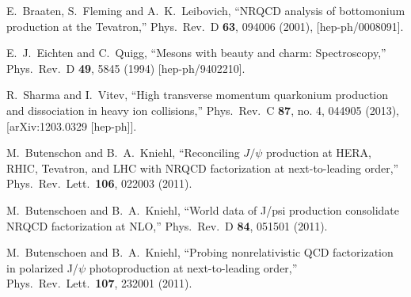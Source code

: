 \documentclass[aps,prc,preprint,superscriptaddress,showpacs,showkeys,amsmath]{revtex4-1}
\begin{document}
\begin{thebibliography}{100}
  E.~Braaten, S.~Fleming and A.~K.~Leibovich,
  ``NRQCD analysis of bottomonium production at the Tevatron,''
  Phys.\ Rev.\ D {\bf 63}, 094006 (2001),
  [hep-ph/0008091].

  E.~J.~Eichten and C.~Quigg,
  ``Mesons with beauty and charm: Spectroscopy,''
  Phys.\ Rev.\ D {\bf 49}, 5845 (1994)
  [hep-ph/9402210].

  R.~Sharma and I.~Vitev,
  ``High transverse momentum quarkonium production and dissociation in heavy ion collisions,''
  Phys.\ Rev.\ C {\bf 87}, no. 4, 044905 (2013),
  [arXiv:1203.0329 [hep-ph]].



  M.~Butenschon and B.~A.~Kniehl,
  ``Reconciling $J/\psi$ production at HERA, RHIC, Tevatron, and LHC with NRQCD factorization at next-to-leading order,''
  Phys.\ Rev.\ Lett.\  {\bf 106}, 022003 (2011).

  M.~Butenschoen and B.~A.~Kniehl,
  ``World data of J/psi production consolidate NRQCD factorization at NLO,''
  Phys.\ Rev.\  D {\bf 84}, 051501 (2011).

  M.~Butenschoen and B.~A.~Kniehl,
  ``Probing nonrelativistic QCD factorization in polarized J/$\psi$ photoproduction at next-to-leading order,''
  Phys.\ Rev.\ Lett.\  {\bf 107}, 232001 (2011).


\end{thebibliography}
\end{document}
